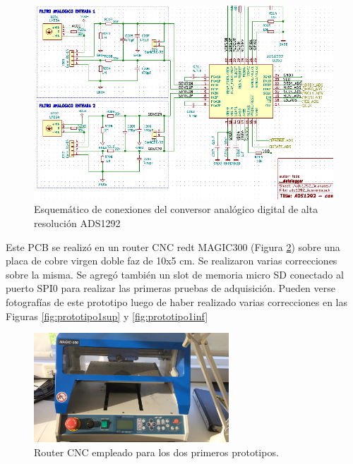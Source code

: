 \begin{figure}[!htbp]
	\centering
	
	\begin{minipage}{\textwidth}
		\includegraphics[width=\textwidth]{./Figures/ads1292_esq.png}		
	\end{minipage}		
	
	\caption{Esquemático de conexiones del conversor analógico digital de alta resolución ADS1292}
	\label{fig:ads1292esq}
\end{figure}



Este PCB se realizó en un router CNC redt MAGIC300 (Figura \ref{fig:magic300}) sobre una placa de cobre virgen doble faz de 10x5 cm. Se realizaron varias correcciones sobre la misma. Se agregó también un slot de memoria micro SD conectado al puerto SPI0 para realizar las primeras pruebas de adquisición. Pueden verse fotografías de este prototipo luego de haber realizado varias correcciones en las Figuras \ref{fig:prototipo1sup} y \ref{fig:prototipo1inf}

\begin{figure}[!htbp]
	\centering
	
	\includegraphics[width=0.65\textwidth]{./Figures/magic300.jpeg}		
	
	\caption{Router CNC empleado para los dos primeros prototipos.}
	\label{fig:magic300}
\end{figure}

